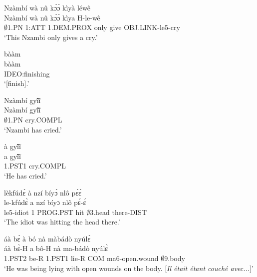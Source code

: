 \begin{exe} 
\exN\label{233}
  \glll Nzàmbí wà nû kɔ́ɔ̀ kìyà léwê \\
         Nzàmbí wà nû kɔ́ɔ̀ kìya H-le-wê \\
        $\emptyset$1.PN 1:ATT 1.DEM.PROX only give OBJ.LINK-le5-cry  \\
    \trans `This Nzambi only gives a cry.'
\end{exe}

\begin{exe} 
\exN\label{234}
  \glll bààm \\
         bààm \\
         IDEO:finishing \\
    \trans `[finish].'
\end{exe}

\begin{exe} 
\exN\label{235}
  \glll Nzàmbí gyĩ́ĩ̀ \\
        Nzàmbí gyĩ́ĩ̀ \\
         $\emptyset$1.PN cry.COMPL \\
    \trans `Nzambi has cried.'
\end{exe}

\begin{exe} 
\exN\label{236}
  \glll à gyĩ́ĩ̀ \\
         a gyĩ́ĩ̀ \\
         1.PST1 cry.COMPL \\
    \trans `He has cried.'
\end{exe}

\begin{exe} 
\exN\label{237}
  \glll lèkfúdɛ̀ à nzí bíyɔ̀ nlô pɛ́ɛ́ \\
      le-kfúdɛ̀ a nzí bíyɔ nlô pɛ́-ɛ́ \\
         le5-idiot 1 PROG.PST hit $\emptyset$3.head there-DIST \\
    \trans `The idiot was hitting the head there.'
\end{exe}

\begin{exe} 
\exN\label{238}
  \glll áà bɛ́ à bó nà màbádò nyúlɛ̀ \\
        áà bɛ̀-H a bô-H nà ma-bádò nyúlɛ̀ \\
        1.PST2 be-R 1.PST1 lie-R COM ma6-open.wound $\emptyset$9.body  \\
    \trans `He was being lying with open wounds on the body. [{\itshape Il était étant couché avec...}]'
\end{exe}

